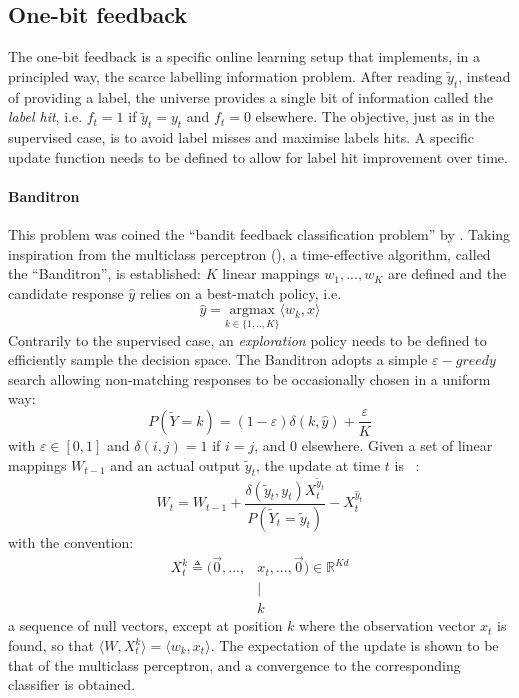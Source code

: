 \documentclass[preprint,12pt,authoryear]{elsarticle}
\begin{document}
\subsection{One-bit feedback}
The one-bit feedback is a specific online learning setup that implements, in a principled way, the scarce labelling information problem. After reading $\tilde{y}_t$, instead of providing a label, the universe provides a single bit of information called the \textit{label hit}, i.e. $f_t = 1$ if  $\tilde{y}_t=y_t$ and $f_t = 0$ elsewhere. The objective, just as in the supervised case, is to avoid label misses and maximise labels hits. A specific update function needs to be defined to allow for label hit improvement over time. 

\paragraph{Banditron} This problem was coined the ``bandit feedback classification problem'' by \cite{kakade2008efficient}. Taking inspiration from the multiclass perceptron (\cite{duda1973pattern}), a time-effective algorithm, called the ``Banditron'', is established:
$K$ linear mappings $w_1, ..., w_K$ are defined and the candidate response  $\hat{y}$ relies on a best-match policy, i.e.
\begin{equation}\label{eq:argmax}
\hat{y} = \underset{k \in\{1,..,K\}}{\text{argmax}}  \langle w_k, x \rangle
\end{equation}
Contrarily to the supervised case, an \textit{exploration} policy needs to be defined to efficiently sample the decision space. The Banditron adopts a simple  $\varepsilon-greedy$ search allowing  non-matching responses to be occasionally chosen in a uniform way:
\begin{equation}\label{eq:eps-greedy}
P(\tilde{Y}=k) = (1-\varepsilon) \delta(k,\hat{y}) + \frac{\varepsilon}{K}
\end{equation}
 with $\varepsilon \in [0,1]$ and $\delta(i,j) =1$ if $i = j$, and 0 elsewhere.
Given a set of linear mappings $W_{t-1}$ %
and an actual output $\tilde{y}_t$, the update at time $t$ is ~:
\begin{equation} \label{eq:banditron-update}
W_t = W_{t-1} + \frac{\delta(\tilde{y}_t ,y_t) X_t^{\tilde{y}_t}}{P(\tilde{Y}_t=\tilde{y}_t)} - X_t^{\hat{y}_t}
\end{equation}   
with the convention:
\begin{align}\label{eq:X}
X_t^k \triangleq (\vec{0}, ..., & x_t, ..., \vec{0}) \in \mathbb{R}^{K d}\\
&\mid\nonumber\\
&k\nonumber
\end{align}
 a sequence of null vectors, except at position $k$ where the observation vector $x_t$ is found, so that
 $
 \langle W, X^k_t\rangle = \langle w_k, x_t\rangle
 $.
The expectation of the update is shown to be that of the multiclass perceptron, and a convergence to the corresponding  classifier is obtained.
\end{document}
